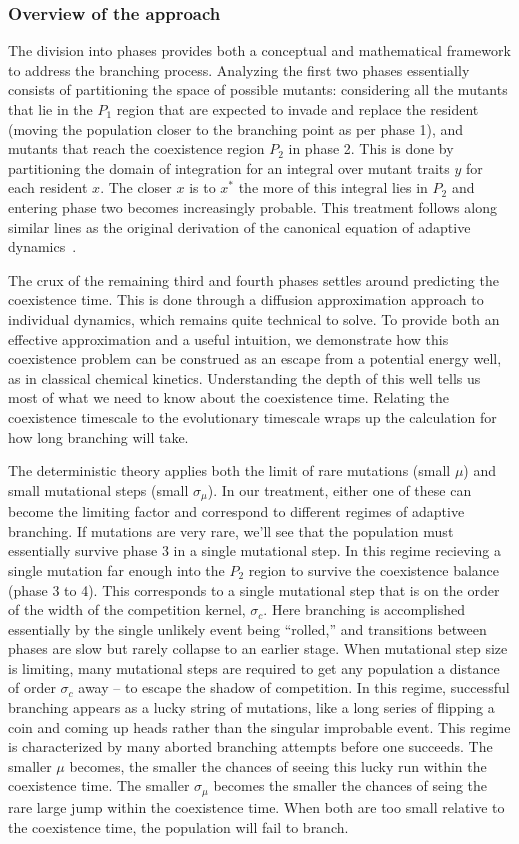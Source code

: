 \documentclass[authoryear,review,11pt]{elsarticle}
\begin{document}
\subsubsection{Overview of the approach}
The division into phases provides both a conceptual and mathematical framework to address the branching process.  Analyzing the first two phases essentially consists of partitioning the space of possible mutants: considering all the mutants that lie in the $P_1$ region that are expected to invade and replace the resident (moving the population closer to the branching point as per phase 1), and mutants that reach the coexistence region $P_2$ in phase 2.  This is done by partitioning the domain of integration for an integral over mutant traits $y$ for each resident $x$.  The closer $x$ is to $x^*$ the more of this integral lies in $P_2$ and entering phase two becomes increasingly probable.  This treatment follows along similar lines as the original derivation of the canonical equation of adaptive dynamics~\citep{dieckmann_jmb1996}.  

The crux of the remaining third and fourth phases settles around predicting the coexistence time.  This is done through a diffusion approximation approach to individual dynamics, which remains quite technical to solve.  To provide both an effective approximation and a useful intuition, we demonstrate how this coexistence problem can be construed as an escape from a potential energy well, as in classical chemical kinetics.  Understanding the depth of this well tells us most of what we need to know about the coexistence time.  Relating the coexistence timescale to the evolutionary timescale wraps up the calculation for how long branching will take.  

The deterministic theory applies both the limit of rare mutations (small $\mu$) and small mutational steps (small $\sigma_{\mu}$).  In our treatment, either one of these can become the limiting factor and correspond to different regimes of adaptive branching.  If mutations are very rare, we'll see that the population must essentially survive phase 3 in a single mutational step.  In this regime recieving a single mutation far enough into the $P_2$ region to survive the coexistence balance (phase 3 to 4).  This corresponds to a single mutational step that is on the order of the width of the competition kernel, $\sigma_c$.  Here branching is accomplished essentially by the single unlikely event being ``rolled,'' and transitions between phases are slow but rarely collapse to an earlier stage.  When mutational step size is limiting, many mutational steps are required to get any population a distance of order $\sigma_c$ away -- to escape the shadow of competition.  In this regime, successful branching appears as a lucky string of mutations, like a long series of flipping a coin and coming up heads rather than the singular improbable event.  This regime is characterized by many aborted branching attempts before one succeeds.  The smaller $\mu$ becomes, the smaller the chances of seeing this lucky run within the coexistence time.  The smaller $\sigma_{\mu}$ becomes the smaller the chances of seing the rare large jump within the coexistence time.  When both are too small relative to the coexistence time, the population will fail to branch.  
\end{document}
